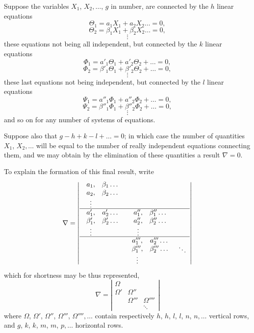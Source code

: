 \documentclass[11pt]{article}
\begin{document}
\noindent Suppose the variables $X_{1}$, $X_{2},\ldots$, $g$ in number, are connected by the $h$ linear
equations
\[
\Theta_{1} = a_{1}X_{1} + a_{2}X_{2}\ldots = 0,
\]
\[
\Theta_{2} = \beta_{1}X_{1} + \beta_{2}X_{2}\ldots = 0,
\]
\[
\vdots
\]
these equations not being all independent, but connected by the $k$ linear equations
\[
\Phi_{1} = a'_{1}\Theta_{1} + a'_{2}\Theta_{2} + \ldots = 0,
\]
\[
\Phi_{2} = \beta'_{1}\Theta_{1} + \beta'_{2}\Theta_{2} + \ldots = 0,
\]
\[
\vdots
\]
these last equations not being independent, but connected by the $l$ linear equations
\[
\Psi_{1} = a''_{1}\Phi_{1} + a''_{2}\Phi_{2} + \ldots = 0,
\]
\[
\Psi_{2} = \beta''_{1}\Phi_{1} + \beta''_{2}\Phi_{2} + \ldots = 0,
\]
\[
\vdots
\]
and so on for any number of systems of equations.

\medskip
Suppose also that $g - h + k - l + \ldots = 0$; in which case the number of quantities
$X_{1}$, $X_{2},\ldots$ will be equal to the number of really independent equations connecting
them, and we may obtain by the elimination of these quantities a result $\nabla = 0$.

\bigskip

To explain the formation of this final result, write
\[
\nabla =
\left|
\begin{array}{ccc}
\begin{array}{cc}
a_{1}, & \beta_{1}\ldots\\
a_{2}, & \beta_{2}\ldots\\
\vdots&
\end{array}
& &\\[-0.2em]
\hline
\begin{array}{cc}
a'_{1}, & a'_{2}\ldots\\
\beta'_{1}, & \beta'_{2}\ldots\\
\vdots&
\end{array}
&
\begin{array}{cc}
a''_{1}, & \beta''_{1}\ldots\\
a''_{2}, & \beta''_{2}\ldots\\
\vdots&
\end{array}
&\\[-0.2em]
\hline
&
\begin{array}{cc}
a'''_{1}, & a'''_{2}\ldots\\
\beta'''_{1}, & \beta'''_{2}\ldots\\
\vdots&
\end{array}
& \ddots
\end{array}
\right|
\]
which for shortness may be thus represented,
\[
\nabla =
\left|
\begin{array}{ccc}
\Omega & &\\
\Omega' & \Omega'' &\\
& \Omega''' & \Omega''''\\
& & \ddots
\end{array}
\right|
\]
where $\Omega$, $\Omega'$, $\Omega''$, $\Omega'''$, $\Omega'''',\ldots$ contain respectively $h$, $h$, $l$, $l$, $n$, $n,\ldots$ vertical rows, and
$g$, $k$, $k$, $m$, $m$, $p,\ldots$ horizontal rows.
\end{document}

